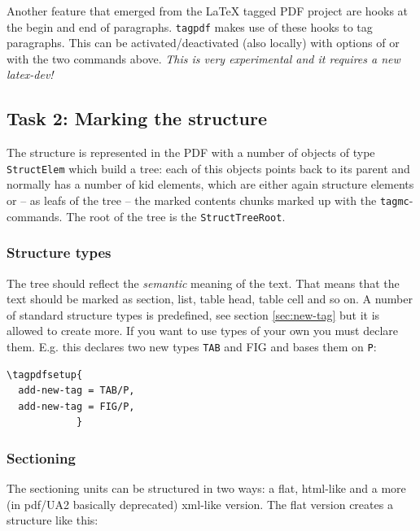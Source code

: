\documentclass[DIV=12,parskip=half-,bibliography=totoc]{scrartcl}
\newcommand\pkg[1]{\texttt{#1}}
\newcommand\PDF{PDF}
\begin{document}
Another feature that emerged from the \LaTeX{} tagged PDF project are hooks at the begin and end of paragraphs.
\pkg{tagpdf} makes use of these hooks to tag paragraphs. This can be activated/deactivated (also locally) with
options of  or with the two commands above. \emph{This is very experimental and it requires a new latex-dev!}

\subsection{Task 2: Marking the structure}



The structure is represented in the \PDF{} with a number of objects of type \texttt{StructElem} which build a tree: each of this objects points back to its parent and normally has a number of kid elements, which are either again structure elements or -- as leafs of the tree -- the marked contents chunks marked up with the \verb+tagmc+-commands. The root of the tree is the \texttt{StructTreeRoot}.



\subsubsection{Structure types}



The tree should reflect the \emph{semantic} meaning of the text. That means that the text should be marked as section, list, table head, table cell and so on. A number of standard structure types is predefined, see section \ref{sec:new-tag} but it is allowed to create more. If you want to use types of your own you must declare them. E.g. this declares two new types \texttt{TAB} and {FIG} and bases them on \texttt{P}:


\begin{lstlisting}
\tagpdfsetup{
  add-new-tag = TAB/P,
  add-new-tag = FIG/P,
            }
\end{lstlisting}



\subsubsection{Sectioning}



The sectioning units can be structured in two ways: a flat, html-like and a more (in pdf/UA2 basically deprecated) xml-like version.
The flat version creates a structure like this:
\end{document}
